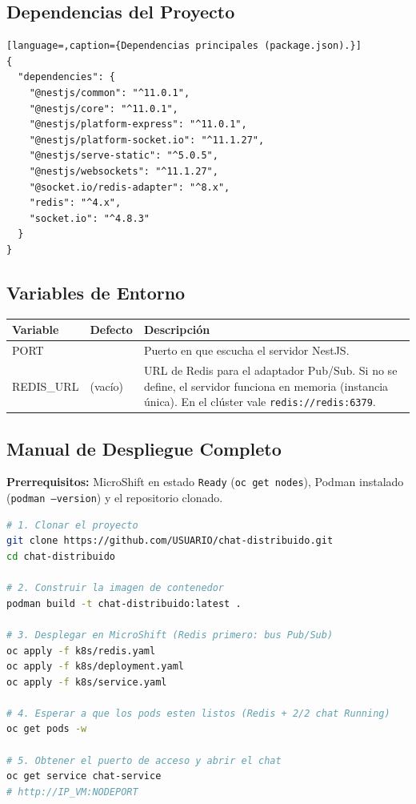 \documentclass[11pt,a4paper]{article}
\begin{document}
\subsection{Dependencias del Proyecto}
\begin{lstlisting}[language=,caption={Dependencias principales (package.json).}]
{
  "dependencies": {
    "@nestjs/common": "^11.0.1",
    "@nestjs/core": "^11.0.1",
    "@nestjs/platform-express": "^11.0.1",
    "@nestjs/platform-socket.io": "^11.1.27",
    "@nestjs/serve-static": "^5.0.5",
    "@nestjs/websockets": "^11.1.27",
    "@socket.io/redis-adapter": "^8.x",
    "redis": "^4.x",
    "socket.io": "^4.8.3"
  }
}
\end{lstlisting}

\subsection{Variables de Entorno}
\begin{tabularx}{\linewidth}{>{\ttfamily}l >{\ttfamily}l X}
\toprule
\normalfont\bfseries Variable & \normalfont\bfseries Defecto & \bfseries Descripción \\
\midrule
PORT & 3000 & Puerto en que escucha el servidor NestJS. \\
REDIS\_URL & (vacío) & URL de Redis para el adaptador Pub/Sub. Si no se define,
el servidor funciona en memoria (instancia única). En el clúster vale
\texttt{redis://redis:6379}. \\
\bottomrule
\end{tabularx}

\subsection{Manual de Despliegue Completo}
\textbf{Prerrequisitos:} MicroShift en estado \texttt{Ready} (\texttt{oc get nodes}),
Podman instalado (\texttt{podman --version}) y el repositorio clonado.

\begin{lstlisting}[language=bash]
# 1. Clonar el proyecto
git clone https://github.com/USUARIO/chat-distribuido.git
cd chat-distribuido

# 2. Construir la imagen de contenedor
podman build -t chat-distribuido:latest .

# 3. Desplegar en MicroShift (Redis primero: bus Pub/Sub)
oc apply -f k8s/redis.yaml
oc apply -f k8s/deployment.yaml
oc apply -f k8s/service.yaml

# 4. Esperar a que los pods esten listos (Redis + 2/2 chat Running)
oc get pods -w

# 5. Obtener el puerto de acceso y abrir el chat
oc get service chat-service
# http://IP_VM:NODEPORT
\end{lstlisting}
\end{document}
